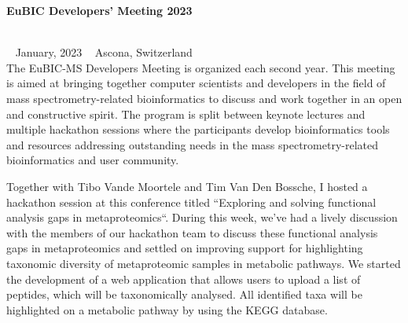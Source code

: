 \begin{large}\textbf{\textsf{EuBIC Developers' Meeting 2023}}\end{large} \\
\faCalendar ~ \textsf{January, 2023} \hfill \faGlobe ~ \textsf{Ascona, Switzerland} \\
The EuBIC-MS Developers Meeting is organized each second year.
This meeting is aimed at bringing together computer scientists and developers in the field of mass spectrometry-related bioinformatics to discuss and work together in an open and constructive spirit.
The program is split between keynote lectures and multiple hackathon sessions where the participants develop bioinformatics tools and resources addressing outstanding needs in the mass spectrometry-related bioinformatics and user community.

Together with Tibo Vande Moortele and Tim Van Den Bossche, I hosted a hackathon session at this conference titled ``Exploring and solving functional analysis gaps in metaproteomics``.
During this week, we've had a lively discussion with the members of our hackathon team to discuss these functional analysis gaps in metaproteomics and settled on improving support for highlighting taxonomic diversity of metaproteomic samples in metabolic pathways.
We started the development of a web application that allows users to upload a list of peptides, which will be taxonomically analysed.
All identified taxa will be highlighted on a metabolic pathway by using the KEGG database.

\newpage
